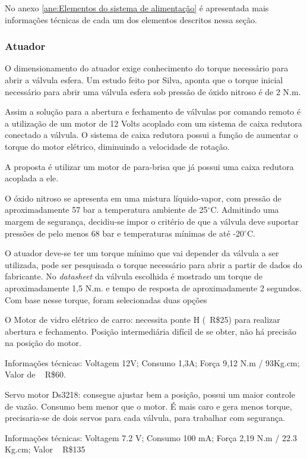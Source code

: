  
\par No anexo \ref{ane:Elementos do sistema de alimentação} é apresentada mais informações técnicas de cada um dos elementos descritos nessa seção.

\subsubsection{Atuador}

\par O dimensionamento do atuador exige conhecimento do torque necessário para abrir a válvula esfera. Um estudo feito por Silva, aponta que o torque inicial necessário para abrir uma válvula esfera sob pressão de óxido nitroso é de 2 N.m.
\par Assim a solução para a abertura e fechamento de válvulas por comando remoto é a utilização de um motor de 12 Volts acoplado com um sistema de caixa redutora conectado a válvula. O sistema de caixa redutora possui a função de aumentar o torque do motor elétrico, diminuindo a velocidade de rotação.
\par A proposta é utilizar um motor de para-brisa que já possui uma caixa redutora acoplada a ele. 

\par O óxido nitroso se apresenta em uma mistura líquido-vapor, com pressão de aproximadamente 57 bar a temperatura ambiente de 25$^{\circ}$C. Admitindo uma margem de segurança, decidiu-se impor o critério de que a válvula deve suportar pressões de pelo menos 68 bar e temperaturas mínimas de até -20$^{\circ}$C. 

\par O atuador deve-se ter um torque mínimo que vai depender da válvula a ser utilizada, pode ser pesquisada o torque necessário para abrir a partir de dados do fabricante. No \textit{datasheet} da válvula escolhida é mostrado um torque de aproximadamente 1,5 N.m. e tempo de resposta de aproximadamente 2 segundos. Com base nesse torque, foram selecionadas duas opções
\par O Motor de vidro elétrico de carro: necessita ponte H (~R\$25) para realizar abertura e fechamento. Posição intermediária difícil de se obter, não há precisão na posição do motor. 
\par Informações técnicas: Voltagem 12V; Consumo 1,3A; Força 9,12 N.m / 93Kg.cm; Valor de ~ R\$60.

\par Servo motor Ds3218: consegue ajustar bem a posição, possui um maior controle de vazão. Consumo bem menor que o motor. É mais caro e gera menos torque, precisaria-se de dois servos para cada válvula, para trabalhar com segurança.
\par Informações técnicas: Voltagem 7.2 V; Consumo 100 mA; Força 2,19 N.m / 22.3 Kg.cm; Valor ~ R\$135

